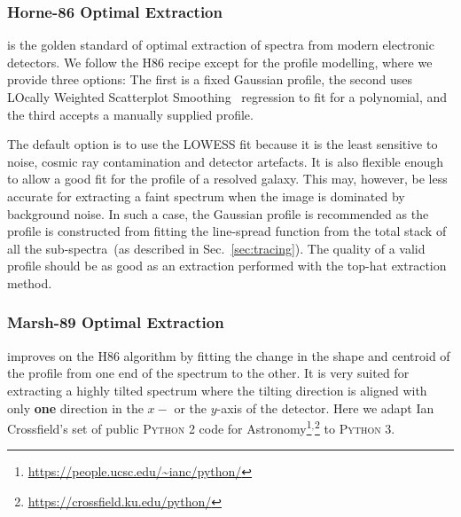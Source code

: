 \documentclass[fleqn,usenatbib]{mnras}
\begin{document}
\subsubsection*{Horne-86 Optimal Extraction}
\citet[hereafter H86]{1986PASP...98..609H} is the golden standard
of optimal extraction of spectra from modern electronic detectors.
We follow the H86 recipe except for the profile modelling,
where we provide three options: The first is a fixed Gaussian
profile, the second uses LOcally Weighted Scatterplot
Smoothing~\citep[LOWESS]{doi:10.1080/01621459.1979.10481038}
regression to fit for a polynomial, and the third accepts
a manually supplied profile.

The default option is to use the LOWESS fit because it is the
least sensitive to noise, cosmic ray contamination and detector
artefacts. It is also flexible enough to allow a good fit for
the profile of a resolved galaxy. This may, however, be less
accurate for extracting a faint spectrum when the image is
dominated by background noise. In such a case, the Gaussian
profile is recommended as the profile is constructed from fitting
the line-spread function from the total stack of all the
sub-spectra~(as described in Sec.~\ref{sec:tracing}). The quality
of a valid profile should be as good as an extraction
performed with the top-hat extraction method.

\subsubsection*{Marsh-89 Optimal Extraction}
\citet[hereafter M89]{1989PASP..101.1032M} improves on the H86
algorithm by fitting the change in the shape and centroid of the
profile from one end of the spectrum to the other. It is very
suited for extracting a highly tilted spectrum where the tilting
direction is aligned with only \textbf{one} direction in the $x-$
or the $y$-axis of the detector. Here we adapt Ian Crossfield's set of public
\textsc{Python 2} code for Astronomy\footnote{\url{https://people.ucsc.edu/~ianc/python/}}$^,$\footnote{\url{https://crossfield.ku.edu/python/}}
to \textsc{Python 3}.
\end{document}
